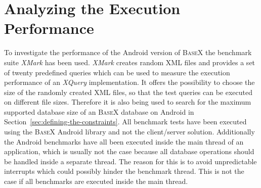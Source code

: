 \section{Analyzing the Execution Performance}
\label{sec:analysing-the-execution-performance}
To investigate the performance of the Android version of \textsc{BaseX} the benchmark suite \textit{XMark} has been used.
\textit{XMark} creates random XML files and provides a set of twenty predefined queries which can be used to measure the execution performance of an \textit{XQuery} implementation.
It offers the possibility to choose the size of the randomly created XML files, so that the test queries can be executed on different file sizes.
Therefore it is also being used to search for the maximum supported database size of an \textsc{BaseX} database on Android in Section~\ref{sec:defining-the-constraints}.
All benchmark tests have been executed using the \textsc{BaseX} Android library and not the client/server solution.
Additionally the Android benchmarks have all been executed inside the main thread of an application, which is usually not the case because all database operations should be handled inside a separate thread.
The reason for this is to avoid unpredictable interrupts which could possibly hinder the benchmark thread. 
This is not the case if all benchmarks are executed inside the main thread.


